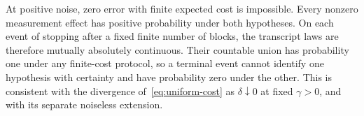 At positive noise, zero error with finite expected cost is impossible.
Every nonzero measurement effect has positive probability under both
hypotheses. On each event of stopping after a fixed finite number of
blocks, the transcript laws are therefore mutually absolutely continuous.
Their countable union has probability one under any finite-cost protocol,
so a terminal event cannot identify one hypothesis with certainty and
have probability zero under the other. This is consistent with the
divergence of~\eqref{eq:uniform-cost} as $\delta\downarrow 0$ at fixed
$\gamma>0$, and with its separate noiseless extension.
